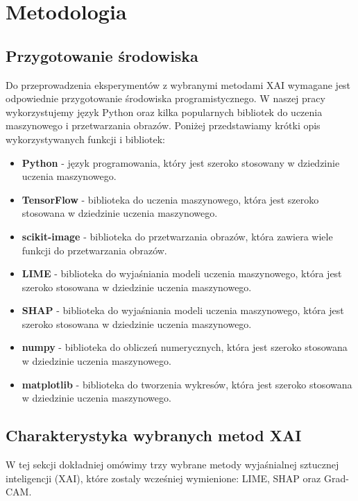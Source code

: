
\chapter*{Metodologia}

\section*{Przygotowanie środowiska}

Do przeprowadzenia eksperymentów z wybranymi metodami XAI wymagane jest odpowiednie przygotowanie środowiska programistycznego.
W naszej pracy wykorzystujemy język Python oraz kilka popularnych bibliotek do uczenia maszynowego i przetwarzania obrazów.
Poniżej przedstawiamy krótki opis wykorzystywanych funkcji i bibliotek:
\begin{itemize}
	\item \textbf{Python} - język programowania, który jest szeroko stosowany w dziedzinie uczenia maszynowego.
	\item \textbf{TensorFlow} - biblioteka do uczenia maszynowego, która jest szeroko stosowana w dziedzinie uczenia maszynowego.
	\item \textbf{scikit-image} - biblioteka do przetwarzania obrazów, która zawiera wiele funkcji do przetwarzania obrazów.
	\item \textbf{LIME} - biblioteka do wyjaśniania modeli uczenia maszynowego, która jest szeroko stosowana w dziedzinie uczenia maszynowego.
	\item \textbf{SHAP} - biblioteka do wyjaśniania modeli uczenia maszynowego, która jest szeroko stosowana w dziedzinie uczenia maszynowego.
	\item \textbf{numpy} - biblioteka do obliczeń numerycznych, która jest szeroko stosowana w dziedzinie uczenia maszynowego.
	\item \textbf{matplotlib} - biblioteka do tworzenia wykresów, która jest szeroko stosowana w dziedzinie uczenia maszynowego.
\end{itemize}

\section*{Charakterystyka wybranych metod XAI}
W tej sekcji dokładniej omówimy trzy wybrane metody wyjaśnialnej sztucznej inteligencji (XAI), które zostaly wcześniej wymienione: LIME, SHAP oraz Grad-CAM.

